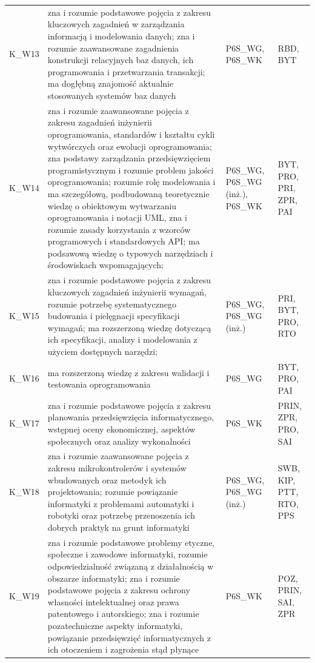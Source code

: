 \documentclass[12pt,a4paper]{article}
\begin{document}
{\begin{longtable}{m{1cm}m{8.8cm}m{2.1cm}m{2.5cm}}
\rowcolor{tableRowLight} K\_W13 & zna i rozumie podstawowe pojęcia z zakresu kluczowych zagadnień w zarządzania informacją i modelowania danych; zna i rozumie zaawansowane zagadnienia konstrukcji relacyjnych baz danych, ich programowania i przetwarzania transakcji; ma dogłębną znajomość aktualnie stosowanych systemów baz danych & {\scriptsize P6S\_WG, P6S\_WK} & {\scriptsize RBD, BYT} \\
\rowcolor{tableRowAlt} K\_W14 & zna i rozumie zaawansowane pojęcia z zakresu zagadnień inżynierii oprogramowania, standardów i kształtu cykli wytwórczych oraz ewolucji oprogramowania; zna podstawy zarządzania przedsięwzięciem programistycznym i rozumie problem jakości oprogramowania; rozumie rolę modelowania i ma szczegółową, podbudowaną teoretycznie wiedzę o obiektowym wytwarzaniu oprogramowania i notacji UML, zna i rozumie zasady korzystania z wzorców programowych i standardowych API; ma podsawową wiedzę o typowych narzędziach i środowiskach wspomagających; & {\scriptsize P6S\_WG, P6S\_WG {\scriptsize (inż.)}, P6S\_WK} & {\scriptsize BYT, PRO, PRI, ZPR, PAI} \\
\rowcolor{tableRowLight} K\_W15 & zna i rozumie podstawowe pojęcia z zakresu kluczowych zagadnień inżynierii wymagań, rozumie potrzebę systematycznego budowania i pielęgnacji specyfikacji wymagań; ma rozszerzoną wiedzę dotyczącą ich specyfikacji, analizy i modelowania z użyciem dostępnych narzędzi; & {\scriptsize P6S\_WG, P6S\_WG {\scriptsize (inż.)}} & {\scriptsize PRI, BYT, PRO, RTO} \\
\rowcolor{tableRowAlt} K\_W16 & ma rozszerzoną wiedzę z zakresu walidacji i testowania oprogramowania & {\scriptsize P6S\_WG} & {\scriptsize BYT, PRO, PAI} \\
\rowcolor{tableRowLight} K\_W17 & zna i rozumie podstawowe pojęcia z zakresu planowania przedsięwzięcia informatycznego, wstępnej oceny ekonomicznej, aspektów społecznych oraz analizy wykonalności & {\scriptsize P6S\_WK} & {\scriptsize PRIN, ZPR, PRO, SAI} \\
\rowcolor{tableRowAlt} K\_W18 & zna i rozumie zaawansowane pojęcia z zakresu mikrokontrolerów i systemów wbudowanych oraz metodyk ich projektowania; rozumie powiązanie informatyki z problemami automatyki i robotyki oraz potrzebę przenoszenia ich dobrych praktyk na grunt informatyki & {\scriptsize P6S\_WG, P6S\_WG {\scriptsize (inż.)}} & {\scriptsize SWB, KIP, PTT, RTO, PPS} \\
\rowcolor{tableRowLight} K\_W19 & zna i rozumie podstawowe problemy etyczne, społeczne i zawodowe informatyki, rozumie odpowiedzialność związaną z działalnością w obszarze informatyki; zna i rozumie podstawowe pojęcia z zakresu ochrony własności intelektualnej oraz prawa patentowego i autorskiego; zna i rozumie pozatechniczne aspekty informatyki, powiązanie przedsięwzięć informatycznych z ich otoczeniem i zagrożenia stąd płynące & {\scriptsize P6S\_WK} & {\scriptsize POZ, PRIN, SAI, ZPR} \\

\end{longtable}}
\end{document}
